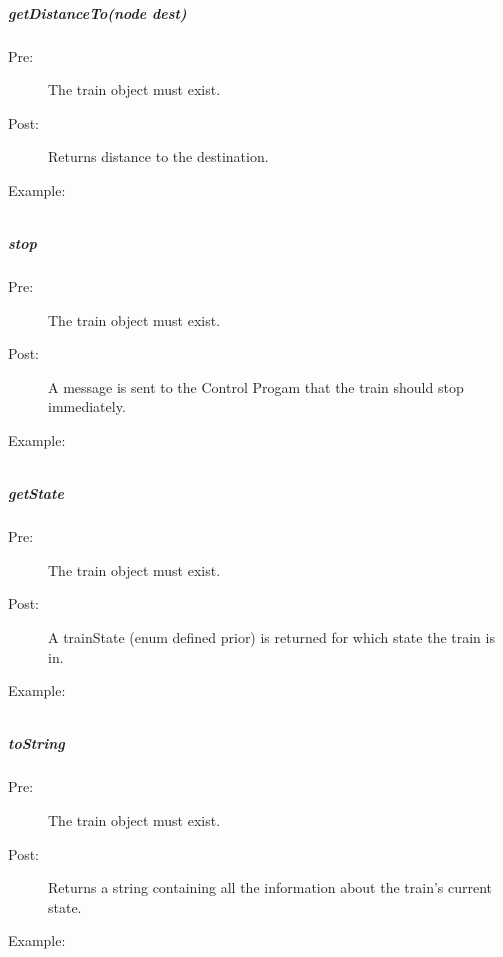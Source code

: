 \documentclass[a4paper,11pt,notitlepage]{article}
\def\CS{Control Progam\xspace} \def\LC{Local Copy of Train State\xspace} \def\TN{Track Node\xspace}
\begin{document}
\subparagraph{getDistanceTo(node dest)} 
\begin{description}
\item[\hspace{1cm}Pre:] The train object must exist. 
\item[\hspace{1cm}Post:] Returns distance to the destination.
\item[\hspace{1cm}Example:]
\begin{verbatim}

\end{verbatim}
\end{description}

\subparagraph{stop} 
\begin{description}
\item[\hspace{1cm}Pre:] The train object must exist. 
\item[\hspace{1cm}Post:] A message is sent to the \CS that the train should stop immediately.
\item[\hspace{1cm}Example:]
\begin{verbatim}

\end{verbatim}
\end{description}

\subparagraph{getState} 
\begin{description}
\item[\hspace{1cm}Pre:] The train object must exist. 
\item[\hspace{1cm}Post:] A trainState (enum defined prior) is returned for which state the train is in.
\item[\hspace{1cm}Example:]
\begin{verbatim}

\end{verbatim}
\end{description}

\subparagraph{toString} 
\begin{description}
\item[\hspace{1cm}Pre:] The train object must exist. 
\item[\hspace{1cm}Post:] Returns a string containing all the information about the train's current state.
\item[\hspace{1cm}Example:]
\begin{verbatim}

\end{verbatim}
\end{description}
\end{document}
